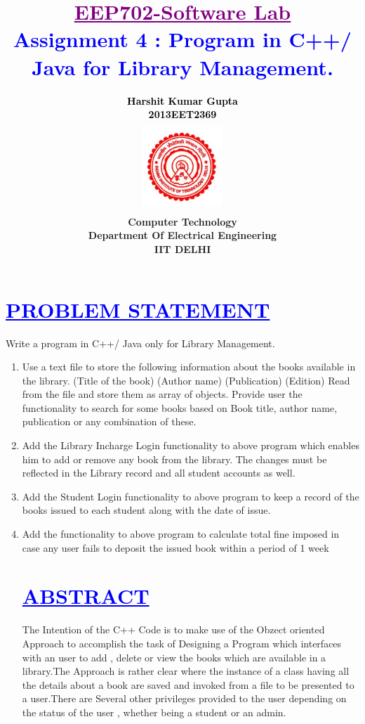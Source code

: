 \documentclass[a4paper,12pt]{report}
\title{\bfseries\huge \textcolor{purple}{\underline {EEP702-Software Lab}} \\{\textcolor{blue}{Assignment 4 : Program in C++/ Java for Library Management.}}}
\author{\bfseries\large\textcolor{black}  {Harshit Kumar Gupta}\\ {\textcolor{black} {2013EET2369 }}\\
\includegraphics[width=3cm,height=3.4cm]{./iit.png}\\\noindent Computer Technology\\
\noindent Department Of Electrical Engineering\\IIT DELHI}
\begin{document}
\maketitle
\tableofcontents


\chapter{\textcolor{blue}{\underline {PROBLEM STATEMENT}}}
\noindent Write a program in C++/ Java only for Library Management.
\begin{enumerate}
 \item   Use a text file to store the following information about the books available in the library.
         (Title of the book) (Author name) (Publication) (Edition)
         Read from the file and store them as array of objects. Provide user the functionality to
         search for some books based on Book title, author name, publication or any combination of these.
 \item   Add the Library Incharge Login functionality to above program which enables him to add
         or remove any book from the library. The changes must be reflected in the Library record
         and all student accounts as well.
         
  \item  Add the Student Login functionality to above program to keep a record of the books
         issued to each student along with the date of issue.
         
  \item  Add the functionality to above program to calculate total fine imposed in case any user
         fails to deposit the issued book within a period of 1 week  

\begin{center}
\chapter{\textcolor{blue}{\underline {ABSTRACT}}}
\end{center}
\noindent The Intention of the C++ Code is to make use of the Obzect oriented Approach to accomplish the task of Designing a Program which
	  interfaces with an user to add , delete or view the books which are available in a library.The Approach is rather clear where the instance
	  of a class having all the details about a book are saved and invoked from a file to be presented to a user.There are Several other privileges provided 
	  to the user depending on the status of the user , whether being a student or an admin.
\begin{center}

\end{center}
\end{enumerate}
\end{document}
